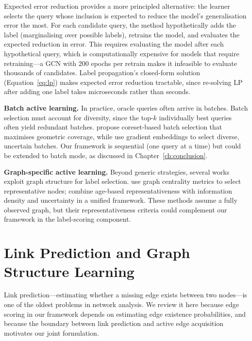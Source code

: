 \documentclass[12pt,a4paper,oneside]{report}
\begin{document}
Expected error reduction \citep{roy} provides a more principled alternative: the learner selects the query whose inclusion is expected to reduce the model's generalisation error the most. For each candidate query, the method hypothetically adds the label (marginalising over possible labels), retrains the model, and evaluates the expected reduction in error. This requires evaluating the model after each hypothetical query, which is computationally expensive for models that require retraining---a GCN with 200 epochs per retrain makes it infeasible to evaluate thousands of candidates. Label propagation's closed-form solution (Equation~\ref{eq:lp}) makes expected error reduction tractable, since re-solving LP after adding one label takes microseconds rather than seconds.

\textbf{Batch active learning.} In practice, oracle queries often arrive in batches. Batch selection must account for diversity, since the top-$k$ individually best queries often yield redundant batches. \citet{sener} propose coreset-based batch selection that maximises geometric coverage, while \citet{ash} use gradient embeddings to select diverse, uncertain batches. Our framework is sequential (one query at a time) but could be extended to batch mode, as discussed in Chapter~\ref{ch:conclusion}.

\textbf{Graph-specific active learning.} Beyond generic strategies, several works exploit graph structure for label selection. \citet{cai_active} use graph centrality metrics to select representative nodes; \citet{age} combine age-based representativeness with information density and uncertainty in a unified framework. These methods assume a fully observed graph, but their representativeness criteria could complement our framework in the label-scoring component.

\section{Link Prediction and Graph Structure Learning}

Link prediction---estimating whether a missing edge exists between two nodes---is one of the oldest problems in network analysis. We review it here because edge scoring in our framework depends on estimating edge existence probabilities, and because the boundary between link prediction and active edge acquisition motivates our joint formulation.
\end{document}
